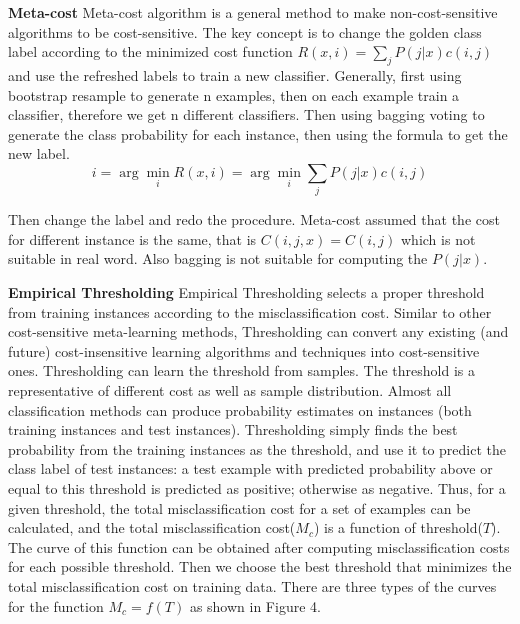 \textbf{Meta-cost} 
Meta-cost algorithm \cite{ref_B} is a general method to make non-cost-sensitive algorithms to be cost-sensitive. The key concept is to change the golden class label according to the minimized cost function $R(x,i)=\sum_{j}P(j|x)c(i,j)$ and use the refreshed labels to train a new classifier. Generally, first using bootstrap resample to generate n examples, then on each example train a classifier, therefore we get n different classifiers. Then using bagging voting to generate the class probability for each instance, then using the formula to get the new label.
\begin{equation}
    i= \arg\min_{i} R(x,i)=\arg\min_{i} \sum_{j} P(j|x)c(i,j)
\end{equation}  

Then change the label and redo the procedure.
Meta-cost assumed that the cost for different instance is the same, that is $C(i,j,x)=C(i,j)$ which is not suitable in real word. Also bagging is not suitable for computing the $P(j|x)$.

\textbf{Empirical Thresholding}
Empirical Thresholding \cite{ref_C} selects a proper threshold from training instances according to the misclassification cost. Similar to other cost-sensitive meta-learning methods, Thresholding can convert any existing (and future) cost-insensitive learning algorithms and techniques into cost-sensitive ones.
Thresholding can learn the threshold from samples. The threshold is a representative of different cost as well as sample distribution. Almost all classification methods can produce probability estimates on instances (both training instances and test instances). Thresholding simply finds the best probability from the training instances as the threshold, and use it to predict the class label of test instances: a test example with predicted probability above or equal to this threshold is predicted as positive; otherwise as negative. Thus, for a given threshold, the total misclassification cost for a set of examples can be calculated, and the total misclassification cost($M_c$) is a function of threshold($T$). The curve of this function can be obtained after computing misclassification costs for each possible threshold. Then we choose the best threshold that minimizes the total misclassification cost on training data. There are three types of the curves for the function $M_c=f(T)$ as shown in Figure 4.


